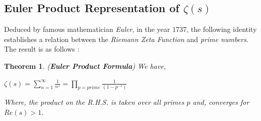 \documentclass[article,12pt]{elsarticle}
\newtheorem{thm}{Theorem}[section]
\begin{document}
	\subsection{Euler Product Representation of $\zeta(s)$}
	
	Deduced by famous mathematician \textit{Euler}, in the year $1737$, the following identity establishes a relation between the \textit{Riemann Zeta Function} and \textit{prime numbers}. The result is as follows :
	\begin{thm}
		(\textbf{Euler Product Formula})  We have, 
		\begin{center}
			$\zeta(s)=\sum\limits_{n=1}^{\infty}\frac{1}{n^{s}}=\prod\limits_{p=prime}\frac{1}{(1-{p^{-s}})}$
		\end{center}
		Where, the product on the R.H.S. is taken over all \textit{primes} $p$ and, converges for $Re(s)>1$.
	\end{thm}
\end{document}
